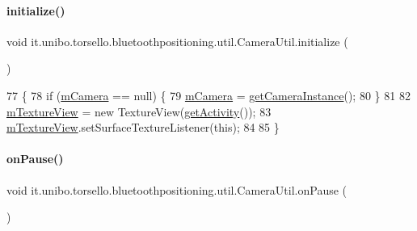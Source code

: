 \paragraph{\texorpdfstring{initialize()}{initialize()}}
{\footnotesize\ttfamily void it.\+unibo.\+torsello.\+bluetoothpositioning.\+util.\+Camera\+Util.\+initialize (\begin{DoxyParamCaption}{ }\end{DoxyParamCaption})}


\begin{DoxyCode}
77                              \{
78         \textcolor{keywordflow}{if} (\hyperlink{classit_1_1unibo_1_1torsello_1_1bluetoothpositioning_1_1util_1_1CameraUtil_ac3d03bd30262a62e27b80e7bab97b40b_ac3d03bd30262a62e27b80e7bab97b40b}{mCamera} == null) \{
79             \hyperlink{classit_1_1unibo_1_1torsello_1_1bluetoothpositioning_1_1util_1_1CameraUtil_ac3d03bd30262a62e27b80e7bab97b40b_ac3d03bd30262a62e27b80e7bab97b40b}{mCamera} = \hyperlink{classit_1_1unibo_1_1torsello_1_1bluetoothpositioning_1_1util_1_1CameraUtil_afd1bf5fd806ad3dd71463e2f0084b619_afd1bf5fd806ad3dd71463e2f0084b619}{getCameraInstance}();
80         \}
81 
82         \hyperlink{classit_1_1unibo_1_1torsello_1_1bluetoothpositioning_1_1util_1_1CameraUtil_a4fb9e02d00c0a61cb6b8992e085cf374_a4fb9e02d00c0a61cb6b8992e085cf374}{mTextureView} = \textcolor{keyword}{new} TextureView(\hyperlink{classit_1_1unibo_1_1torsello_1_1bluetoothpositioning_1_1util_1_1CameraUtil_ad49c34169e8267bb8f841d27f0d5804b_ad49c34169e8267bb8f841d27f0d5804b}{getActivity}());
83         \hyperlink{classit_1_1unibo_1_1torsello_1_1bluetoothpositioning_1_1util_1_1CameraUtil_a4fb9e02d00c0a61cb6b8992e085cf374_a4fb9e02d00c0a61cb6b8992e085cf374}{mTextureView}.setSurfaceTextureListener(\textcolor{keyword}{this});
84 
85     \}
\end{DoxyCode}
\hypertarget{classit_1_1unibo_1_1torsello_1_1bluetoothpositioning_1_1util_1_1CameraUtil_a1ebe095e57994dfb73a9ead49d72017e_a1ebe095e57994dfb73a9ead49d72017e}{}\label{classit_1_1unibo_1_1torsello_1_1bluetoothpositioning_1_1util_1_1CameraUtil_a1ebe095e57994dfb73a9ead49d72017e_a1ebe095e57994dfb73a9ead49d72017e} 
\paragraph{\texorpdfstring{on\+Pause()}{onPause()}}
{\footnotesize\ttfamily void it.\+unibo.\+torsello.\+bluetoothpositioning.\+util.\+Camera\+Util.\+on\+Pause (\begin{DoxyParamCaption}{ }\end{DoxyParamCaption})}


